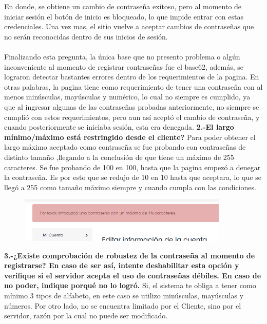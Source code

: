 \documentclass{article}
\begin{document}
En donde, se obtiene un cambio de contraseña exitoso, pero al momento de iniciar sesión el botón de inicio es bloqueado, lo que impide entrar con estas credenciales. Una vez mas, el sitio vuelve a aceptar cambios de contraseñas que no serán reconocidas dentro de sus inicios de sesión.
\\\\
Finalizando esta pregunta, la única base que no presento problema o algún inconveniente al momento de registrar contraseñas fue el base62, además, se lograron detectar bastantes errores dentro de los requerimientos de la pagina. En otras palabras, la pagina tiene como  requerimiento de tener una contraseña con al menos minúsculas, mayúsculas y numérico, lo cual no siempre es cumplido, ya que al ingresar algunas de las contraseñas probadas anteriormente, no siempre se cumplió con estos requerimientos, pero aun así aceptó el cambio de contraseña, y cuando posteriormente se iniciaba sesión, esta era denegada.
\newpage
\textbf{2.-El largo mínimo/máximo está restringido desde el cliente?}
\newline
Para poder obtener el largo máximo aceptado como contraseña se fue probando con contraseñas de distinto tamaño ,llegando a la conclusión de que tiene un máximo de 255 caracteres. Se fue probando de 100 en 100, hasta que la pagina empezó a denegar la contraseña. Es por esto que se redujo de 10 en 10 hasta que aceptara, lo que se llegó a 255 como tamaño máximo siempre y cuando cumpla con las condiciones. 

\begin{figure}[h!]
    \centering
    \includegraphics[width=10cm]{pass.PNG}
\end{figure}

\textbf{3.-¿Existe comprobación de robustez de la contraseña al momento de registrarse? En caso de ser así, intente deshabilitar esta opción y verifique si el servidor acepta el uso de contraseñas débiles. En caso de no poder, indique porqué no lo logró.}
\newline
Si, el sistema te obliga a tener como mínimo 3 tipos de alfabeto, en este caso se utilizo minúsculas, mayúsculas y números. Por otro lado, no se encuentra limitado por el Cliente, sino por el servidor, razón por la cual no puede ser modificado. 
\end{document}
